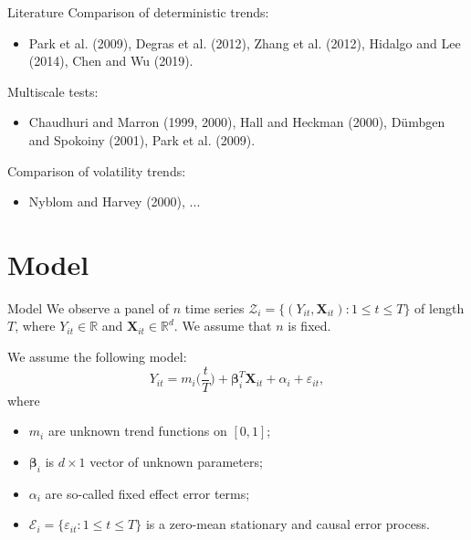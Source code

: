 \documentclass[10pt, handout]{beamer}
\newcommand{\Eps}{\mathcal{E}}
\newcommand{\eps}{\varepsilon}
\newcommand{\reals}{\mathbb{R}}
\newcommand{\X}{\boldsymbol{X}}
\newcommand{\bfbeta}{\boldsymbol{\beta}}
\begin{document}
\begin{frame}{Literature}
	Comparison of deterministic trends:
	\begin{itemize}
		\item {Park et al. (2009)}, Degras et al. (2012), Zhang et al. (2012), Hidalgo and Lee (2014), Chen and Wu (2019).
	\end{itemize}\pause\pause
	Multiscale tests:
	\begin{itemize}
		\item Chaudhuri and Marron (1999, 2000), Hall and Heckman (2000), D{\"u}mbgen and Spokoiny (2001), {Park et al. (2009)}.
	\end{itemize}\pause\pause
	Comparison of volatility trends:
	\begin{itemize}
		\item Nyblom and Harvey (2000), ...
	\end{itemize}
\end{frame}


\section{Model}

\begin{frame}{Model}
We observe a panel of $n$ time series $\mathcal{Z}_i = \{(Y_{it}, \X_{it}): 1 \le t \le T \}$ of length $T$, where $Y_{it} \in \reals$ and $\X_{it}\in \reals^{d}$. \pause We assume that $n$ is fixed. \pause

We assume the following model:
\begin{equation*}
Y_{it} = m_i \Big( \frac{t}{T} \Big) + \bfbeta_i^T\X_{it}+ \alpha_i + \varepsilon_{it},
\end{equation*}\pause
\vspace{-3mm}
where
\begin{itemize}
\item $m_i$ are unknown trend functions on $[0,1]$;\pause
\item $\bfbeta_i$ is $d\times 1$ vector of unknown parameters;\pause
\item $\alpha_i$ are so-called fixed effect error terms;
\item $\Eps_i = \{\eps_{it}: 1\leq t \leq T\}$ is a zero-mean stationary and causal error process.
\end{itemize}
\end{frame}
\end{document}
